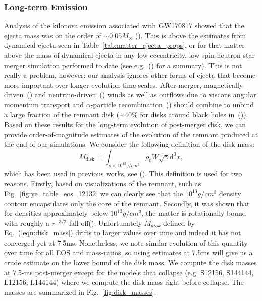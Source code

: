 \subsubsection{Long-term Emission}
\label{sec:long_term}
Analysis of the kilonova emission associated with GW170817 showed that the ejecta mass was on the order of $\sim 0.05M_\odot$ (\citet*{Metzger:2017wot,shibata2017gw170817}). This is above the estimates from dynamical ejecta seen in Table~\ref{tab:matter_ejecta_props}, or for that matter above the mass of dynamical ejecta in any low-eccentricity, low-spin neutron star merger simulation performed to date (see e.g.~(\citet*{Dietrich:2016fpt}) for a summary). This is not really a problem, however: our analysis ignores other forms of ejecta that become more important over longer evolution time scales. 
After merger, magnetically-driven~(\citet*{siegel:2017nub,fernandez2019long}) and neutrino-driven~(\citet*{just2014}) winds as well as outflows due to viscous angular momentum transport and $\alpha$-particle recombination~(\citet*{fernandez2013}) should combine to unbind a large fraction of the remnant disk ($\sim 40\%$ for disks around black holes in~(\citet*{fernandez2019long})). Based on these results for the long-term evolution of post-merger disk, we can provide order-of-magnitude estimates of the evolution of the remnant produced at the end of our simulations. We consider
the following definition of the disk mass:
%
\begin{equation}
  \label{eqn:disk_mass}
M_{\text{disk}} = \int_{\rho < 10^{13}g/cm^3} \rho_0 W \sqrt{\gamma} \mathrm{d}^3x,
\end{equation}
%
which has been used in previous works, see (\citet*{radice2018binary,shibata2017gw170817}). This definition is used for two reasons. Firstly, based on visualizations of the remnant, such as Fig.~\ref{fig:ye_table_eos_12132} we can clearly see that the $10^{13}g/cm^3$ density contour encapsulates only the core of the remnant. Secondly, it was shown that for densities approximately below $10^{13}g/cm^3$, the matter is rotationally bound with roughly a $r^{-3/2}$ fall-off(\citet*{hanauske2017rotational}). Unfortunately $M_{disk}$ defined by Eq.~(\ref{eqn:disk_mass}) drifts to larger values over time and indeed it has not converged yet at 7.5ms. Nonetheless, we note similar evolution of this quantity over time for all EOS and mass-ratios, so using estimates at 7.5ms will give us a crude estimate on the lower bound of the disk mass.  We compute the disk masses at 7.5-ms post-merger except for the models that collapse  (e.g. S12156, S144144, L12156, L144144) where we compute the disk mass right before collapse. The masses are summarized in Fig.~\ref{fig:disk_masses}. 


